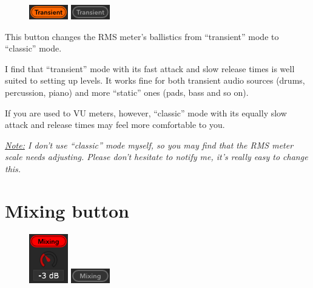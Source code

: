 \begin{figure}
  \includegraphics[scale=\screenshotscale,clip]{include/images/button_transient_on.png}
  \newline \vspace{-0.9\baselineskip}
  \includegraphics[scale=\screenshotscale,clip]{include/images/button_transient_off.png}
\end{figure}

This button changes the RMS meter's ballistics from ``transient'' mode
to ``classic'' mode.

I find that ``transient'' mode with its fast attack and slow release
times is well suited to setting up levels.  It works fine for both
transient audio sources (drums, percussion, piano) and more ``static''
ones (pads, bass and so on).

If you are used to VU meters, however, ``classic'' mode with its
equally slow attack and release times may feel more comfortable to
you.

\emph{\underline{Note:} I don't use ``classic'' mode myself, so you
  may find that the RMS meter scale needs adjusting.  Please don't
  hesitate to notify me, it's really easy to change this.}

\section{Mixing button}
\label{sec:mixing_button}

\begin{figure}
  \includegraphics[scale=\screenshotscale,clip]{include/images/button_mixing_on.png}
  \newline \vspace{-0.9\baselineskip}
  \includegraphics[scale=\screenshotscale,clip]{include/images/button_mixing_off.png}
\end{figure}

